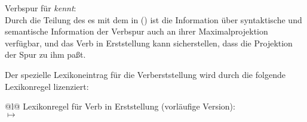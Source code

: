 \eas
Verbspur für \emph{kennt}:\\
\label{le-verbspur-kennt}%
\samepage
{}
\zs
Durch die Teilung des \localw{}es mit dem \dslw in () ist die Information
über syntaktische und semantische Information der Verbspur auch an ihrer Maximalprojektion
verfügbar, und das Verb in Erststellung kann sicherstellen, dass die Projektion der Spur zu ihm paßt.

Der spezielle Lexikoneintrag für die Verberststellung wird durch die folgende
Lexikonregel lizenziert:
\eas
\label{lr-verb-movement}
\begin{tabular}[t]{@{}l@{}}
Lexikonregel für Verb in Erststellung (vorläufige Version):\\
 $\mapsto$\\
\end{tabular}
\zs

